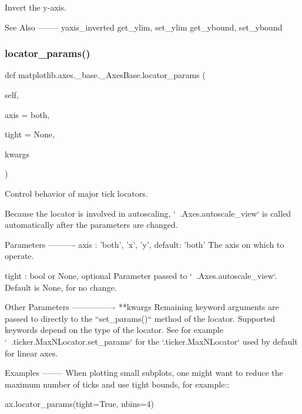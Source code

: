 \begin{DoxyVerb}Invert the y-axis.

See Also
--------
yaxis_inverted
get_ylim, set_ylim
get_ybound, set_ybound
\end{DoxyVerb}
 \mbox{\label{classmatplotlib_1_1axes_1_1__base_1_1__AxesBase_ad216bc73e69844202f6ccb94dcd396c4}} 
\subsubsection{\texorpdfstring{locator\+\_\+params()}{locator\_params()}}
{\footnotesize\ttfamily def matplotlib.\+axes.\+\_\+base.\+\_\+\+Axes\+Base.\+locator\+\_\+params (\begin{DoxyParamCaption}\item[{}]{self,  }\item[{}]{axis = {\ttfamily \textquotesingle{}both\textquotesingle{}},  }\item[{}]{tight = {\ttfamily None},  }\item[{}]{kwargs }\end{DoxyParamCaption})}

\begin{DoxyVerb}Control behavior of major tick locators.

Because the locator is involved in autoscaling, `~.Axes.autoscale_view`
is called automatically after the parameters are changed.

Parameters
----------
axis : {'both', 'x', 'y'}, default: 'both'
    The axis on which to operate.

tight : bool or None, optional
    Parameter passed to `~.Axes.autoscale_view`.
    Default is None, for no change.

Other Parameters
----------------
**kwargs
    Remaining keyword arguments are passed to directly to the
    ``set_params()`` method of the locator. Supported keywords depend
    on the type of the locator. See for example
    `~.ticker.MaxNLocator.set_params` for the `.ticker.MaxNLocator`
    used by default for linear axes.

Examples
--------
When plotting small subplots, one might want to reduce the maximum
number of ticks and use tight bounds, for example::

    ax.locator_params(tight=True, nbins=4)\end{DoxyVerb}
 \mbox{\label{classmatplotlib_1_1axes_1_1__base_1_1__AxesBase_a3c3e39d0eedc849927aa9ac859e903ec}} 
